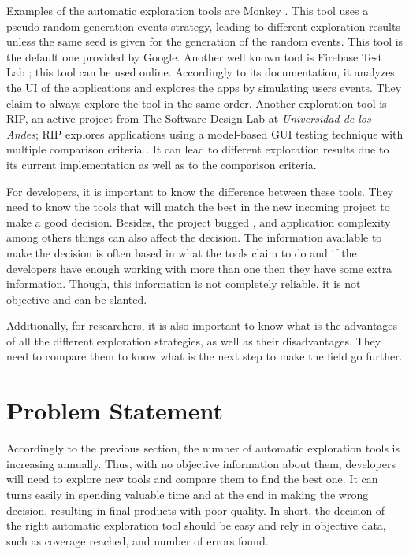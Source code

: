 Examples of the automatic exploration tools are Monkey \MARIO{[CITE]}. This tool uses a pseudo-random generation events strategy, leading to different exploration results unless the same seed is given for the generation of the random events. This tool is the default one provided by Google. Another well known tool is Firebase Test Lab ; this tool can be used online. Accordingly to its documentation, it analyzes the UI of the applications and explores the apps by simulating users events. They claim to always explore the tool in the same order. Another exploration tool is RIP, an active project from  The Software Design Lab at \emph{Universidad de los Andes}; RIP explores applications using a model-based GUI testing technique with multiple comparison criteria . It can lead to different exploration results due to its current implementation as well as to the comparison criteria. 

For developers, it  is important to know the difference between these tools. They need to know the tools that will match the best  in the new incoming project to make a good decision. Besides, the project bugged , and application complexity among others things can also affect the decision. The information available to make the decision is often based in what the tools claim to do and if the developers have enough working  with more than one then they have some extra information. Though, this information is not completely reliable, it is not objective and can be slanted.

Additionally, for researchers, it is also important to know what is the advantages of all the different exploration strategies, as well as their disadvantages. They need to compare them to know what is the next step to make the field go further.


\section{Problem Statement}

Accordingly to the previous section, the number of automatic exploration tools is increasing annually. Thus, with no objective information about them, developers  will need to explore new tools and compare them to find the best one. It can turns easily in spending valuable time and at the end in making the wrong decision, resulting in final products with poor quality. In short, the decision of the right automatic exploration tool should be easy and rely in objective data, such as coverage reached, and number of errors found.

